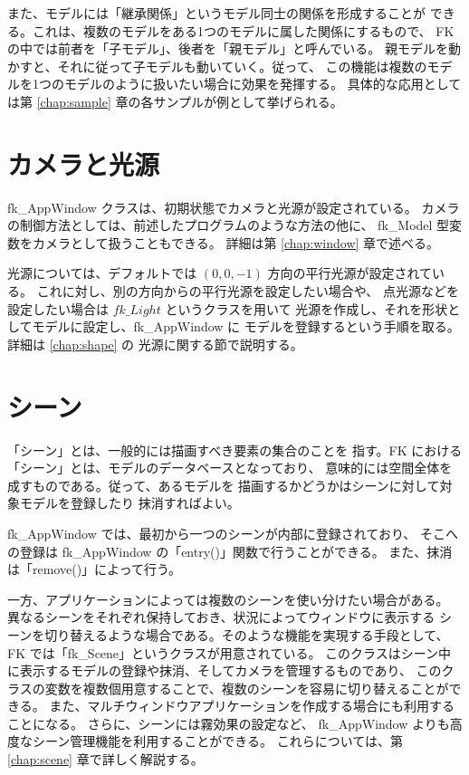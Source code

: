 また、モデルには「継承関係」というモデル同士の関係を形成することが
できる。これは、複数のモデルをある1つのモデルに属した関係にするもので、
FK の中では前者を「子モデル」、後者を「親モデル」と呼んでいる。
親モデルを動かすと、それに従って子モデルも動いていく。従って、
この機能は複数のモデルを1つのモデルのように扱いたい場合に効果を発揮する。
具体的な応用としては第 \ref{chap:sample} 章の各サンプルが例として挙げられる。

\section{カメラと光源}
fk\_AppWindow クラスは、初期状態でカメラと光源が設定されている。
カメラの制御方法としては、前述したプログラムのような方法の他に、
fk\_Model 型変数をカメラとして扱うこともできる。
詳細は第 \ref{chap:window} 章で述べる。

光源については、デフォルトでは \((0, 0, -1)\) 方向の平行光源が設定されている。
これに対し、別の方向からの平行光源を設定したい場合や、
点光源などを設定したい場合は \(fk\_Light\) というクラスを用いて
光源を作成し、それを形状としてモデルに設定し、fk\_AppWindow に
モデルを登録するという手順を取る。詳細は \ref{chap:shape} の
光源に関する節で説明する。

\section{シーン}

「シーン」とは、一般的には描画すべき要素の集合のことを
指す。FK における「シーン」とは、モデルのデータベースとなっており、
意味的には空間全体を成すものである。従って、あるモデルを
描画するかどうかはシーンに対して対象モデルを登録したり
抹消すればよい。

fk\_AppWindow では、最初から一つのシーンが内部に登録されており、
そこへの登録は fk\_AppWindow の「entry()」関数で行うことができる。
また、抹消は「remove()」によって行う。

一方、アプリケーションによっては複数のシーンを使い分けたい場合がある。
異なるシーンをそれぞれ保持しておき、状況によってウィンドウに表示する
シーンを切り替えるような場合である。そのような機能を実現する手段として、
FK では「fk\_Scene」というクラスが用意されている。
このクラスはシーン中に表示するモデルの登録や抹消、そしてカメラを管理するものであり、
このクラスの変数を複数個用意することで、複数のシーンを容易に切り替えることができる。
また、マルチウィンドウアプリケーションを作成する場合にも利用することになる。
さらに、シーンには霧効果の設定など、
fk\_AppWindow よりも高度なシーン管理機能を利用することができる。
これらについては、第 \ref{chap:scene} 章で詳しく解説する。

